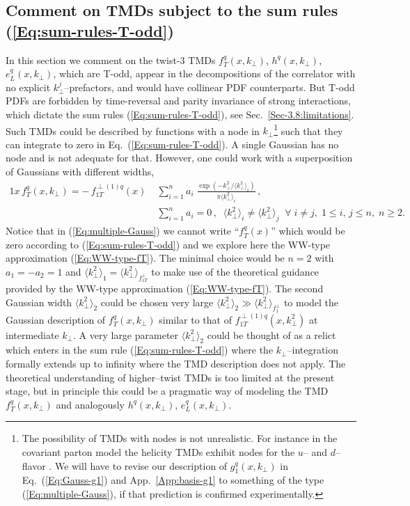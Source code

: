 \documentclass[a4paper,11pt]{article}
\newcommand{\la}{\langle}
\newcommand{\ra}{\rangle}
\def\kperp{k_\perp}
\begin{document}
\subsection{Comment on TMDs subject to the sum rules (\ref{Eq:sum-rules-T-odd})}
\label{App-B:comment-Todd-twist-3}

In this section we comment on the twist-3 TMDs 
$f_T^q(x,\kperp)$,  $h^q(x,\kperp)$, $e_L^q(x,\kperp)$,  
which are T-odd, appear in the decompositions of the correlator with no 
explicit $k_\perp^j$--prefactors, and would have collinear PDF counterparts. 
But T-odd PDFs are forbidden by time-reversal and parity invariance of 
strong interactions, which dictate the sum rules (\ref{Eq:sum-rules-T-odd}), 
see Sec.~\ref{Sec-3.8:limitations}. 
Such TMDs could be described by functions with a node in 
$k_\perp$\footnote{The possibility of TMDs with nodes is not unrealistic.
	For instance in the covariant parton model the helicity TMDs 
	exhibit nodes for the $u$-- and $d$--flavor \cite{Efremov:2010mt}.
	We will have to revise our description of $g_1^q(x,\kperp)$ 
	in Eq.~(\ref{Eq:Gauss-g1}) and App.~\ref{App:basis-g1} to something 
	of the type (\ref{Eq:multiple-Gauss}), if that prediction is 
	confirmed experimentally. }
such that they can integrate to zero in Eq.~(\ref{Eq:sum-rules-T-odd}).
A single Gaussian has no node and is not adequate for that.
However, one could work with a superposition of Gaussians
with different widths, 
\begin{alignat}{1}
	x \, f_T^q(x,\kperp) =  - \, f_{1T}^{\perp (1)q}(x)\;
	&\sum\limits_{i=1}^{n} a_i\;
	\frac{\exp(-\kperp^2/\la\kperp^2\ra_i^{ })}{\pi\la\kperp^2\ra_i^{ }}\,,
	\label{Eq:multiple-Gauss}\\
	&\sum\limits_{i=1}^n a_i = 0\,, \;\;
	\la\kperp^2\ra_i^{ }\neq\la\kperp^2\ra_j^{ }\;\;\forall\;i\neq j,
	\; 1\le i,\,j\le n,\;n\ge 2.\nonumber
\end{alignat}
Notice that in (\ref{Eq:multiple-Gauss}) we cannot write ``$f_T^q(x)$'' 
which would be zero according to (\ref{Eq:sum-rules-T-odd}) and we
explore here the WW-type approximation (\ref{Eq:WW-type-fT}). 
The minimal choice would be $n=2$ with $a_1=-a_2=1$ and
$\la\kperp^2\ra_1^{ } = \la\kperp^2\ra_{f_{1T}^\perp}$ to make use 
of the theoretical guidance provided by the WW-type approximation 
(\ref{Eq:WW-type-fT}). 
The second Gaussian width $\la\kperp^2\ra_2^{ }$ could be chosen
very large $\la\kperp^2\ra_2^{ } \gg \la\kperp^2\ra_{f_1^\perp}$ to
model the Gaussian description of $f_T^{q}(x,\kperp)$ similar to 
that of $f_{1T}^{\perp(1)q}(x,\kperp^2)$ at intermediate $\kperp$.
A very large parameter $\la\kperp^2\ra_2^{ }$ could be thought of as
a relict which enters in the sum rule (\ref{Eq:sum-rules-T-odd}) 
where the $\kperp$--integration formally extends up to infinity 
where the TMD description does not apply. The theoretical
understanding of higher--twist TMDs is too limited at
the present stage, but in principle this could be a 
pragmatic way of modeling the TMD $f_T^q(x,\kperp)$
and analogously $h^q(x,\kperp)$, $e_L^q(x,\kperp)$.
\end{document}
